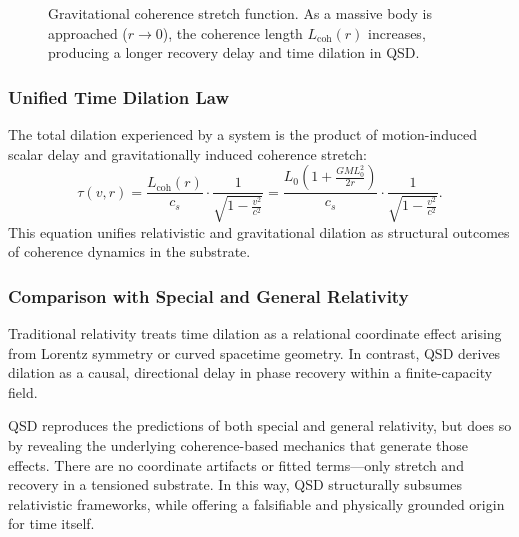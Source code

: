 \documentclass[entropy,article,submit,pdftex,moreauthors]{Definitions/mdpi}
\begin{document}
\begin{figure}[ht]
\centering
{}
\caption{Gravitational coherence stretch function. As a massive body is approached ($r \to 0$), the coherence length $L_{\text{coh}}(r)$ increases, producing a longer recovery delay and time dilation in QSD.}
\label{fig:Lcoh-stretch}
\end{figure}


\subsubsection{Unified Time Dilation Law}

The total dilation experienced by a system is the product of motion-induced scalar delay and gravitationally induced coherence stretch:
\begin{equation}
\tau(v, r) = \frac{L_{\text{coh}}(r)}{c_s} \cdot \frac{1}{\sqrt{1 - \frac{v^2}{c^2}}}
= \frac{L_0 \left(1 + \frac{GM L_0^2}{2r}\right)}{c_s} \cdot \frac{1}{\sqrt{1 - \frac{v^2}{c^2}}}.
\end{equation}
This equation unifies relativistic and gravitational dilation as structural outcomes of coherence dynamics in the substrate.

\subsubsection{Comparison with Special and General Relativity}

Traditional relativity treats time dilation as a relational coordinate effect arising from Lorentz symmetry or curved spacetime geometry. In contrast, QSD derives dilation as a causal, directional delay in phase recovery within a finite-capacity field.

QSD reproduces the predictions of both special and general relativity, but does so by revealing the underlying coherence-based mechanics that generate those effects. There are no coordinate artifacts or fitted terms—only stretch and recovery in a tensioned substrate. In this way, QSD structurally subsumes relativistic frameworks, while offering a falsifiable and physically grounded origin for time itself.
\end{document}

